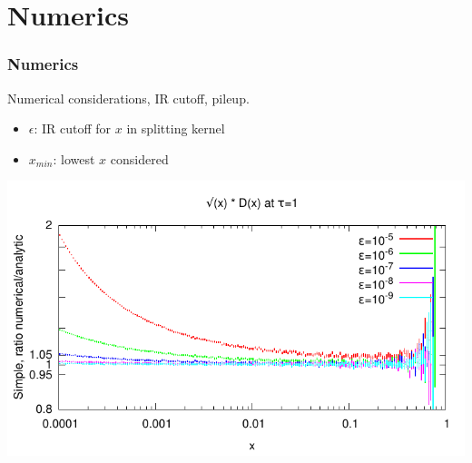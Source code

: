 \documentclass[pstricks,mathserif]{beamer}
\begin{document}
\section{Numerics}

\begin{frame}
\frametitle{Numerics}
Numerical considerations, IR cutoff, pileup.

\begin{itemize}
\item $\epsilon$: IR cutoff for $x$ in splitting kernel
\item $x_{min}$: lowest $x$ considered
\end{itemize}


{
\centering
\includegraphics[width=1\linewidth]{convergence.pdf}
}

\end{frame}
\end{document}
